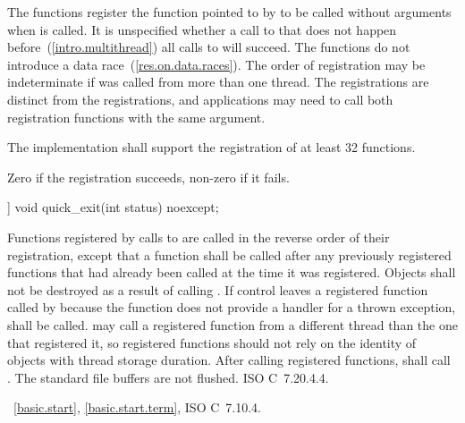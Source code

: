 \begin{itemdescr}
\pnum
\effects The  functions register the function pointed to by 
to be called without arguments when  is called.
It is unspecified whether a call to  that does not
happen before~(\ref{intro.multithread}) all calls to  will succeed. \enternote The
 functions do not introduce a
data race~(\ref{res.on.data.races}). \exitnote
\enternote
The order of registration may be indeterminate if  was called from more
than one thread.
\exitnote
\enternote The
 registrations are distinct from the  registrations,
and applications may need to call both registration functions with the same argument.
\exitnote

\pnum
\implimits
The implementation shall support the registration of at least 32 functions.

\pnum
\returns Zero if the registration succeeds, non-zero if it fails.
\end{itemdescr}

\begin{itemdecl}
[[noreturn]] void quick_exit(int status) noexcept;
\end{itemdecl}

\begin{itemdescr}
\pnum
\effects Functions registered by calls to  are called in the
reverse order of their registration, except that a function shall be called after any
previously registered functions that had already been called at the time it was
registered. Objects shall not be destroyed as a result of calling .
If control leaves a registered function called by  because the
function does not provide a handler for a thrown exception,  shall
be called.%
\enternote {} may call a registered function from a different thread
than the one that registered it, so registered functions should not rely on the identity
of objects with thread storage duration. \exitnote
After calling registered functions,  shall call .
\enternote The standard file buffers are not flushed. \xsee ISO C~7.20.4.4. \exitnote

\end{itemdescr}

\xref~\ref{basic.start}, \ref{basic.start.term},
ISO C~7.10.4.

